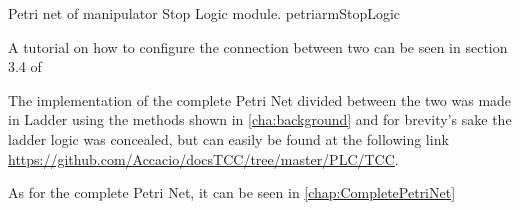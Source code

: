 


\newpage

{Petri net of manipulator Stop Logic module.}
{petriarmStopLogic}

\newpage




A tutorial on how to configure the connection between two \PLCs can be seen in
section 3.4 of \cite{rochapereira2019automacao}




The implementation of the complete Petri Net divided between the two \PLCs was
made in Ladder using the methods shown in \autoref{cha:background}  and for
brevity's sake the ladder logic was concealed, but can easily be
found at the following link
\url{https://github.com/Accacio/docsTCC/tree/master/PLC/TCC}.

As for the
complete Petri Net, it can be seen in \autoref{chap:CompletePetriNet} 

